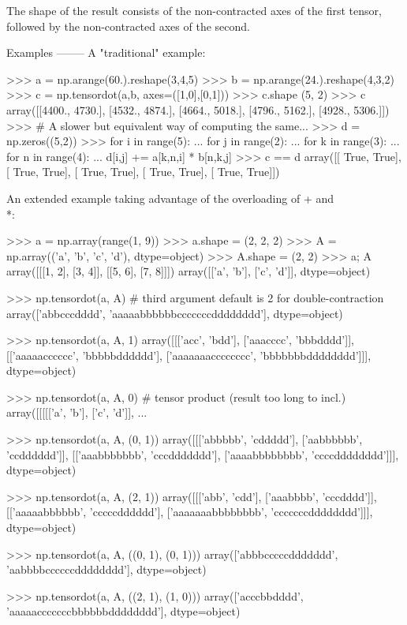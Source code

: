 \begin{DoxyVerb}
The shape of the result consists of the non-contracted axes of the
first tensor, followed by the non-contracted axes of the second.

Examples
--------
A "traditional" example:

>>> a = np.arange(60.).reshape(3,4,5)
>>> b = np.arange(24.).reshape(4,3,2)
>>> c = np.tensordot(a,b, axes=([1,0],[0,1]))
>>> c.shape
(5, 2)
>>> c
array([[4400., 4730.],
       [4532., 4874.],
       [4664., 5018.],
       [4796., 5162.],
       [4928., 5306.]])
>>> # A slower but equivalent way of computing the same...
>>> d = np.zeros((5,2))
>>> for i in range(5):
...   for j in range(2):
...     for k in range(3):
...       for n in range(4):
...         d[i,j] += a[k,n,i] * b[n,k,j]
>>> c == d
array([[ True,  True],
       [ True,  True],
       [ True,  True],
       [ True,  True],
       [ True,  True]])

An extended example taking advantage of the overloading of + and \\*:

>>> a = np.array(range(1, 9))
>>> a.shape = (2, 2, 2)
>>> A = np.array(('a', 'b', 'c', 'd'), dtype=object)
>>> A.shape = (2, 2)
>>> a; A
array([[[1, 2],
        [3, 4]],
       [[5, 6],
        [7, 8]]])
array([['a', 'b'],
       ['c', 'd']], dtype=object)

>>> np.tensordot(a, A) # third argument default is 2 for double-contraction
array(['abbcccdddd', 'aaaaabbbbbbcccccccdddddddd'], dtype=object)

>>> np.tensordot(a, A, 1)
array([[['acc', 'bdd'],
        ['aaacccc', 'bbbdddd']],
       [['aaaaacccccc', 'bbbbbdddddd'],
        ['aaaaaaacccccccc', 'bbbbbbbdddddddd']]], dtype=object)

>>> np.tensordot(a, A, 0) # tensor product (result too long to incl.)
array([[[[['a', 'b'],
          ['c', 'd']],
          ...

>>> np.tensordot(a, A, (0, 1))
array([[['abbbbb', 'cddddd'],
        ['aabbbbbb', 'ccdddddd']],
       [['aaabbbbbbb', 'cccddddddd'],
        ['aaaabbbbbbbb', 'ccccdddddddd']]], dtype=object)

>>> np.tensordot(a, A, (2, 1))
array([[['abb', 'cdd'],
        ['aaabbbb', 'cccdddd']],
       [['aaaaabbbbbb', 'cccccdddddd'],
        ['aaaaaaabbbbbbbb', 'cccccccdddddddd']]], dtype=object)

>>> np.tensordot(a, A, ((0, 1), (0, 1)))
array(['abbbcccccddddddd', 'aabbbbccccccdddddddd'], dtype=object)

>>> np.tensordot(a, A, ((2, 1), (1, 0)))
array(['acccbbdddd', 'aaaaacccccccbbbbbbdddddddd'], dtype=object)\end{DoxyVerb}
 \mbox{\label{namespacenumpy_1_1core_1_1numeric_aff34b60351859b2e2797e226ad04ddd0}} 
